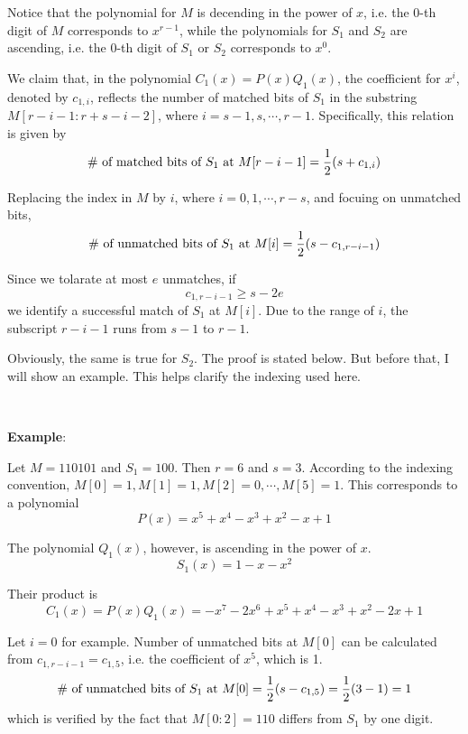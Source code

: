 \documentclass{article}
\begin{document}
Notice that the polynomial for $M$ is decending in the power of $x$, i.e. the 0-th digit of $M$ corresponds to $x^{r-1}$, while the polynomials for $S_1$ and $S_2$ are ascending, i.e. the 0-th digit of $S_1$ or $S_2$ corresponds to $x^0$.

We claim that, in the polynomial $C_1(x)=P(x)Q_1(x)$, the coefficient for $x^i$, denoted by $c_{1,i}$, reflects the number of matched bits of $S_1$ in the substring $M[r-i-1:r+s-i-2]$, where $i=s-1,s,\cdots,r-1$. Specifically, this relation is given by
\begin{equation*}
\textup{\# of matched bits of $S_1$ at $M[r-i-1]$}=\frac{1}{2}(s+c_{1,i})
\end{equation*}

Replacing the index in $M$ by $i$, where $i=0,1,\cdots,r-s$, and focuing on unmatched bits,
\begin{equation*}
\textup{\# of unmatched bits of $S_1$ at $M[i]$}=\frac{1}{2}(s-c_{1,r-i-1})
\end{equation*}

Since we tolarate at most $e$ unmatches, if
\begin{equation*}
c_{1,r-i-1}\geqslant s-2e
\end{equation*}
we identify a successful match of $S_1$ at $M[i]$. Due to the range of $i$, the subscript $r-i-1$ runs from $s-1$ to $r-1$.

Obviously, the same is true for $S_2$. The proof is stated below. But before that, I will show an example. This helps clarify the indexing used here.

~

\noindent\textbf{Example}:

Let $M=110101$ and $S_1=100$. Then $r=6$ and $s=3$. According to the indexing convention, $M[0]=1,M[1]=1,M[2]=0,\cdots,M[5]=1$. This corresponds to a polynomial
\begin{equation*}
P(x)=x^5+x^4-x^3+x^2-x+1
\end{equation*}

The polynomial $Q_1(x)$, however, is ascending in the power of $x$.
\begin{equation*}
S_1(x)=1-x-x^2
\end{equation*}

Their product is
\begin{equation*}
C_1(x)=P(x)Q_1(x)=-x^7-2x^6+x^5+x^4-x^3+x^2-2x+1
\end{equation*}

Let $i=0$ for example. Number of unmatched bits at $M[0]$ can be calculated from $c_{1,r-i-1}=c_{1,5}$, i.e. the coefficient of $x^5$, which is 1.
\begin{equation*}
\textup{\# of unmatched bits of $S_1$ at $M[0]$}=\frac{1}{2}(s-c_{1,5})=\frac{1}{2}(3-1)=1
\end{equation*}
which is verified by the fact that $M[0:2]=110$ differs from $S_1$ by one digit.
\end{document}
